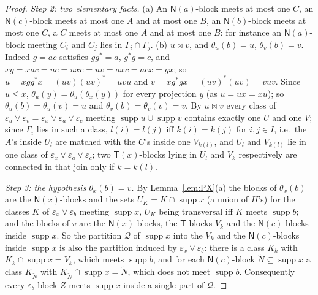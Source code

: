 \documentclass[11pt]{amsart}
\theoremstyle{definition}
\newcommand{\supp}{\operatorname{supp}}
\newcommand{\T}{\mathsf{T}}
\newcommand{\N}{\mathsf{N}}
\begin{document}
\begin{proof}
\emph{Step 2: two elementary facts.} (a) An $\N(a)$-block meets at most one $C$, an $\N(c)$-block meets at most one $A$ and at most one $B$, an $\N(b)$-block meets at most one $C$, a $C$ meets at most one $A$ and at most one $B$: for instance an $\N(a)$-block meeting $C_i$ and $C_j$ lies in $\Gamma_i\cap\Gamma_j$. (b) $u\bowtie v$, and $\theta_u(b)=u$, $\theta_v(b)=v$. Indeed $g=ac$ satisfies $gg^*=a$, $g^*g=c$, and $xg=xac=uc=uxc=uv=axc=acx=gx$; so $u=xgg^*x=(uv)(uv)^*=uvu$ and $v=xg^*gx=(uv)^*(uv)=vuv$. Since $u\le x$, $\theta_u(y)=\theta_u(\theta_x(y))$ for every projection $y$ (as $u=ux=xu$); so $\theta_u(b)=\theta_u(v)=u$ and $\theta_v(b)=\theta_v(v)=v$. By $u\bowtie v$ every class of $\varepsilon_u\vee\varepsilon_v=\varepsilon_x\vee\varepsilon_a\vee\varepsilon_c$ meeting $\supp u\cup\supp v$ contains exactly one $U$ and one $V$; since $\Gamma_i$ lies in such a class, $l(i)=l(j)$ iff $k(i)=k(j)$ for $i,j\in I$, i.e.\ the $A$'s inside $U_l$ are matched with the $C$'s inside one $V_{k(l)}$, and $U_l$ and $V_{k(l)}$ lie in one class of $\varepsilon_x\vee\varepsilon_a\vee\varepsilon_c$; two $\T(x)$-blocks lying in $U_l$ and $V_k$ respectively are connected in that join only if $k=k(l)$.

\emph{Step 3: the hypothesis $\theta_x(b)=v$.} By Lemma~\ref{lem:PX}(a) the blocks of $\theta_x(b)$ are the $\N(x)$-blocks and the sets $U_K=K\cap\supp x$ (a union of $H$'s) for the classes $K$ of $\varepsilon_x\vee\varepsilon_b$ meeting $\supp x$, $U_K$ being transversal iff $K$ meets $\supp b$; and the blocks of $v$ are the $\N(x)$-blocks, the $\T$-blocks $V_k$ and the $\N(c)$-blocks inside $\supp x$. So the partition $\mathcal Q$ of $\supp x$ into the $V_k$ and the $\N(c)$-blocks inside $\supp x$ is also the partition induced by $\varepsilon_x\vee\varepsilon_b$: there is a class $K_k$ with $K_k\cap\supp x=V_k$, which meets $\supp b$, and for each $\N(c)$-block $\tilde N\subseteq\supp x$ a class $K_{\tilde N}$ with $K_{\tilde N}\cap\supp x=\tilde N$, which does not meet $\supp b$. Consequently every $\varepsilon_b$-block $Z$ meets $\supp x$ inside a single part of $\mathcal Q$.


\end{proof}
\end{document}
